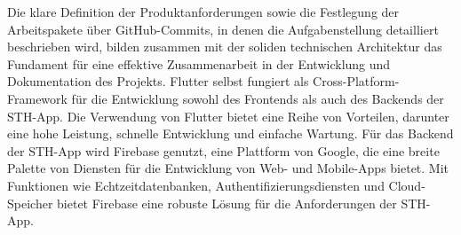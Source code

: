 Die klare Definition der Produktanforderungen sowie die Festlegung der Arbeitspakete über GitHub-Commits, in denen die Aufgabenstellung detailliert beschrieben wird, bilden zusammen mit der soliden technischen Architektur das Fundament für eine effektive Zusammenarbeit in der Entwicklung und Dokumentation des Projekts.
Flutter selbst fungiert als Cross-Platform-Framework für die Entwicklung sowohl des Frontends als auch des Backends der STH-App. Die Verwendung von Flutter bietet eine Reihe von Vorteilen, darunter eine hohe Leistung, schnelle Entwicklung und einfache Wartung.
Für das Backend der STH-App wird Firebase genutzt, eine Plattform von Google, die eine breite Palette von Diensten für die Entwicklung von Web- und Mobile-Apps bietet. Mit Funktionen wie Echtzeitdatenbanken, Authentifizierungsdiensten und Cloud-Speicher bietet Firebase eine robuste Lösung für die Anforderungen der STH-App.
